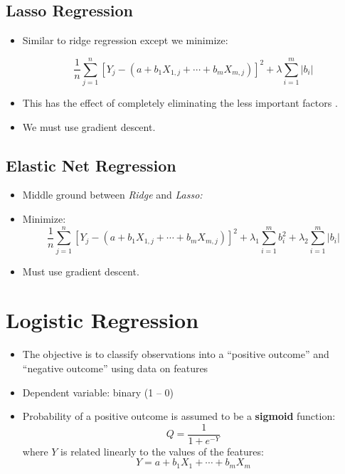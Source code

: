 \subsection{Lasso Regression}

\begin{itemize}
    \item Similar to ridge regression except we minimize:
          
          \begin{equation*}
              \frac{1}{n}\sum\limits _{j=1}^{n}\left[ Y_{j} -\left( a+b_{1} X_{1,j} +\cdots +b_{m} X_{m,j}\right)\right]^{2} +\lambda \sum _{i=1}^{m}\left| b_{i}\right| 
          \end{equation*}
    \item This has the effect of completely eliminating the less important factors .
    \item We must use gradient descent.
\end{itemize}

\subsection{Elastic Net Regression}

\begin{itemize}
    \item Middle ground between \textit{Ridge} and \textit{Lasso:}
    \item Minimize:
          \begin{equation*}
              \frac{1}{n}\sum\limits _{j=1}^{n}[ Y_{j} -( a+b_{1} X_{1,j} +\cdots +b_{m} X_{m,j})]^{2} +\lambda _{1}\sum _{i=1}^{m} b_{i}^{2} +\lambda _{2}\sum _{i=1}^{m}| b_{i}| 
          \end{equation*}
    \item Must use gradient descent.
\end{itemize}

\section{Logistic Regression}

\begin{itemize}
    \item The objective is to classify observations into a “positive outcome” and “negative outcome” using data on features
    \item Dependent variable: binary (1 – 0)
    \item Probability of a positive outcome is assumed to be a \textbf{sigmoid} function:
          \begin{equation*}
              Q=\frac{1}{1+e^{-Y}}
          \end{equation*}where $Y$ is related linearly to the values of the features:
          \begin{equation*}
              Y=a+b_{1} X_{1} +\cdots +b_{m} X_{m}
          \end{equation*}          
\end{itemize}

